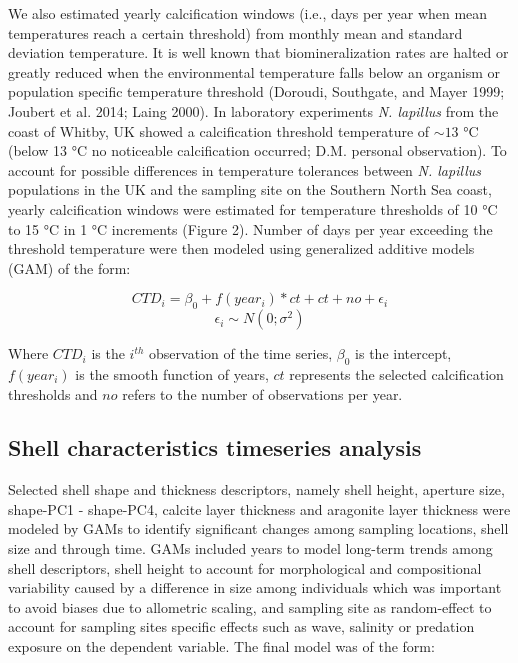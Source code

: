 \documentclass[smallextended]{svjour3}       %
\begin{document}
We also estimated yearly calcification windows (i.e., days per year when
mean temperatures reach a certain threshold) from monthly mean and
standard deviation temperature. It is well known that biomineralization
rates are halted or greatly reduced when the environmental temperature
falls below an organism or population specific temperature threshold
(Doroudi, Southgate, and Mayer 1999; Joubert et al. 2014; Laing 2000).
In laboratory experiments \emph{N. lapillus} from the coast of Whitby,
UK showed a calcification threshold temperature of \(\sim13\) °C (below
13 °C no noticeable calcification occurred; D.M. personal observation).
To account for possible differences in temperature tolerances between
\emph{N. lapillus} populations in the UK and the sampling site on the
Southern North Sea coast, yearly calcification windows were estimated
for temperature thresholds of 10 °C to 15 °C in 1 °C increments (Figure
2). Number of days per year exceeding the threshold temperature were
then modeled using generalized additive models (GAM) of the form:

\[
CTD_i = \beta_0 + f(year_i) * ct + ct + no + \epsilon_i
\] \[
\epsilon_i \sim N(0; \sigma^2)
\]

Where \(CTD_i\) is the \(i^{th}\) observation of the time series,
\(\beta_0\) is the intercept, \(f(year_i)\) is the smooth function of
years, \(ct\) represents the selected calcification thresholds and
\(no\) refers to the number of observations per year.

\hypertarget{shell-characteristics-timeseries-analysis}{%
\subsection{Shell characteristics timeseries
analysis}\label{shell-characteristics-timeseries-analysis}}

Selected shell shape and thickness descriptors, namely shell height,
aperture size, shape-PC1 - shape-PC4, calcite layer thickness and
aragonite layer thickness were modeled by GAMs to identify significant
changes among sampling locations, shell size and through time. GAMs
included years to model long-term trends among shell descriptors, shell
height to account for morphological and compositional variability caused
by a difference in size among individuals which was important to avoid
biases due to allometric scaling, and sampling site as random-effect to
account for sampling sites specific effects such as wave, salinity or
predation exposure on the dependent variable. The final model was of the
form:
\end{document}
